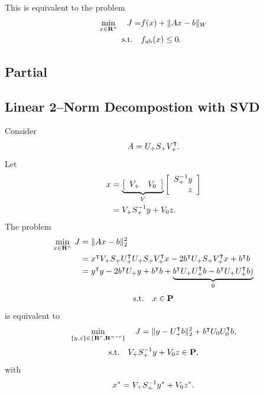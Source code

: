 \documentclass{article}
\begin{document}
    This is equivalent to the problem
    \begin{align*}
        \min_{x\in\textbf{R}^n}\quad J = &f(x)+\|A x - b\|_W\\
        \text{s.t.}\quad &f_{\text{ub}}(x)\leq0.
    \end{align*}

\clearpage
\subsection{Partial \QP}

\subsection{Linear 2--Norm Decompostion with SVD}
    Consider
    \begin{align*}
        A = U_+S_+V_+^\intercal.
    \end{align*}
    Let
    \begin{align*}
        x&=\underbrace{\mat{V_+ & V_0}}_{V}\mat{\psv^{-1} y \\ 
        \phantom{\psv^{-1}}z}\\
        &=\rrs \psv^{-1} y + \rns z.
    \end{align*}
    The problem
    \begin{align*}
        \min_{x\in\textbf{R}^n}\:J
        &= \| A x - b \|_2^2 \\
        &= x^\intercal V_+ S_+ U_+^\intercal U_+ S_+ V_+^\intercal x
            -2b^\intercal U_+ S_+ V_+^\intercal x +b^\intercal b\\
        &= y^\intercal y
            -2b^\intercal U_+ y +b^\intercal b+\underbrace{b^\intercal U_+U_+^\intercal b-b^\intercal U_+U_+^\intercal b)}_{0}
    \end{align*}
    \begin{align*}
        \text{s.t.} \quad x \in\textbf{P}
    \end{align*}
    is equivalent to
    \begin{align*}
    \min_{\{y,z\}\in\{\textbf{R}^r,\textbf{R}^{n-r}\}}\quad J=\|y - U_+^\intercal b\|_2^2 + b^\intercal U_0U_0^\intercal b,
    \end{align*}
    \begin{align*}
        \text{s.t.} \quad V_+ S_+^{-1} y + V_0 z \in\textbf{P},
    \end{align*}
    with 
    \begin{align*}
        x^* = V_+ S_+^{-1} y^* + V_0 z^*.
    \end{align*}
\end{document}
